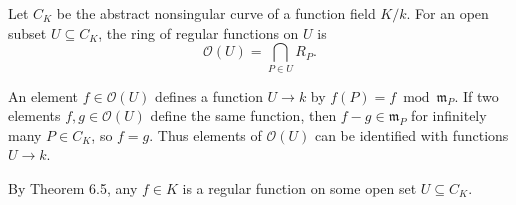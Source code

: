 Let $C_K$ be the abstract nonsingular curve of a function field $K/k$. For an open subset $U \subseteq C_K$, the ring of regular functions on $U$ is
$$\mathcal{O}(U) = \bigcap_{P \in U} R_P.$$

An element $f \in \mathcal{O}(U)$ defines a function $U \to k$ by $f(P) = f \bmod \mathfrak{m}_P$. If two elements $f, g \in \mathcal{O}(U)$ define the same function, then $f - g \in \mathfrak{m}_P$ for infinitely many $P \in C_K$, so $f = g$. Thus elements of $\mathcal{O}(U)$ can be identified with functions $U \to k$.

By Theorem 6.5, any $f \in K$ is a regular function on some open set $U \subseteq C_K$.
